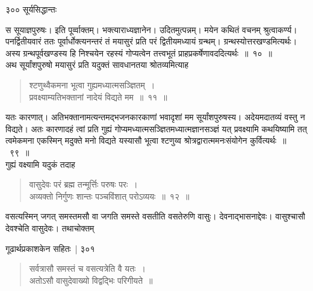 \documentclass[11pt, openany]{book}
\begin{document}
\newpage

\noindent ३०० \hspace{4cm} सूर्यसिद्धान्तः 
\vspace{1cm}


 स सूयाज्ञपुरुषः। इति पूर्व्वाक्तम्। भक्त्याराध्यज्ञानेन। उदितमुत्पन्नम्। मयेन कथितं वचनम् श्रुत्वाकर्ण्य। पनर्द्वितीयवारं ततः पूर्वार्धोक्त्यनन्तरं तं मयासुरं प्रति परं द्वितीयमध्यायं ग्रन्थम्। ग्रन्थस्योत्तरखण्डमित्यर्थः। अस्य ग्रन्थपूर्वखण्डस्य हि निश्चयेन रहस्यं गोप्यत्वेन तत्त्वभूतं प्राह\textendash प्रकर्षेणावददित्यर्थः~॥~१०~॥\\
 \noindent अथ सूर्यांशपुरुषो मयासुरं प्रति यदुक्तं सावधानतया श्रोतव्यमित्याह\textendash
 


\begin{quote}
 {\ssi श्टणुथ्वैकमना भूत्वा गुह्यमध्यात्मसञ्ज्ञितम्~।\\
प्रवक्ष्याम्यतिभक्तानां नादेयं विद्यते मम~॥~११~॥ }
\end{quote}

 यतः कारणात्। अतिभक्तानामत्यन्तमद्भजनकारकाणां भवादृशां मम सूर्यांशपुरुषस्य। अदेयमदातव्यं वस्तु न विद्यते। अतः कारणादहं त्वां प्रति गुह्यं गोप्यमध्यात्मसञ्ज्ञितमध्यात्मज्ञानसञ्ज्ञं यत् प्रवक्ष्यामि कथयिष्यामि तत् त्वमेकमना एकस्मिन् मदुक्ते मनो विद्यते यस्यासौ भूत्वा श्टणुय्व श्रोत्रद्वारात्ममनःसंयोगेन कुर्वित्यर्थः~॥~९९~॥\\
 \noindent गुह्यं वक्ष्यामि यदुकं तदाह\textendash
 


\begin{quote}
 {\ssi वासुदेवः परं ब्रह्म तन्मूर्त्तिः परुषः परः~।\\
अव्यक्तो निर्गुणः शान्तः पञ्चविंशात् परोऽव्ययः~॥~१२~॥ }
\end{quote}


 वसत्यस्मिन् जगत् समस्तमसौ वा जगति समस्ते वसतीति वसतेरुणि वासुः। देवनाद्भासनाद्देवः। वासुश्चासौ देवश्चेति वासुदेवः। तथाचोक्तम्\textendash



\newpage

\hspace{3cm} गूढार्थप्रकाशकेन सहितः~| \hfill ३०१
\vspace{1cm}



\begin{quote}
{\qt सर्वत्रासौ समस्तं च वसत्यत्रेति वै यतः~।\\
 अतोऽसौ वासुदेवाख्यो विद्वद्भिः परिगीयते~॥}
\end{quote}
\end{document}
